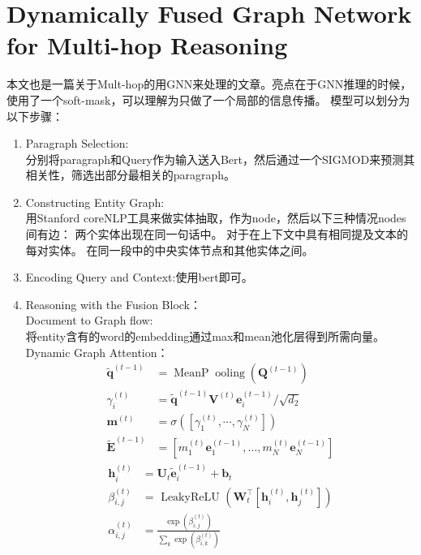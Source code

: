 \documentclass[a4paper,UTF8]{article}
\numberwithin{equation}{section}
\begin{document}
\section{Dynamically Fused Graph Network for Multi-hop Reasoning}
本文也是一篇关于Mult-hop的用GNN来处理的文章。亮点在于GNN推理的时候，使用了一个soft-mask，可以理解为只做了一个局部的信息传播。
模型可以划分为以下步骤：
\begin{enumerate}
	\item Paragraph Selection:\\分别将paragraph和Query作为输入送入Bert，然后通过一个SIGMOD来预测其相关性，筛选出部分最相关的paragraph。
	\item Constructing Entity Graph:\\用Stanford coreNLP工具来做实体抽取，作为node，然后以下三种情况nodes间有边：
	\subitem[1] 两个实体出现在同一句话中。
	\subitem[2] 对于在上下文中具有相同提及文本的每对实体。
	\subitem[3] 在同一段中的中央实体节点和其他实体之间。
	\item Encoding Query and Context:使用bert即可。
	\item Reasoning with the Fusion Block：\\
	Document to Graph flow:\\将entity含有的word的embedding通过max和mean池化层得到所需向量。\\
	Dynamic Graph Attention：
	\begin{equation}
	\begin{aligned} \tilde{\mathbf{q}}^{(t-1)} &=\operatorname{MeanP} \operatorname{ooling}\left(\mathbf{Q}^{(t-1)}\right) \\ \gamma_{i}^{(t)} &=\tilde{\mathbf{q}}^{(t-1)} \mathbf{V}^{(t)} \mathbf{e}_{i}^{(t-1)} / \sqrt{d_{2}} \\ \mathbf{m}^{(t)} &=\sigma\left(\left[\gamma_{1}^{(t)}, \cdots, \gamma_{N}^{(t)}\right]\right) \\ \tilde{\mathbf{E}}^{(t-1)} &=\left[m_{1}^{(t)} \mathbf{e}_{1}^{(t-1)}, \ldots, m_{N}^{(t)} \mathbf{e}_{N}^{(t-1)}\right] \end{aligned}
	\end{equation}
	\begin{equation}
	\begin{aligned} \mathbf{h}_{i}^{(t)} &=\mathbf{U}_{t} \tilde{\mathbf{e}}_{i}^{(t-1)}+\mathbf{b}_{t} \\ \beta_{i, j}^{(t)} &=\text { LeakyReLU }\left(\mathbf{W}_{t}^{\top}\left[\mathbf{h}_{i}^{(t)}, \mathbf{h}_{j}^{(t)}\right]\right) \\ \alpha_{i, j}^{(t)} &=\frac{\exp \left(\beta_{i, j}^{(t)}\right)}{\sum_{k} \exp \left(\beta_{i, k}^{(t)}\right)} \end{aligned}

\end{equation}
\end{enumerate}
\end{document}
